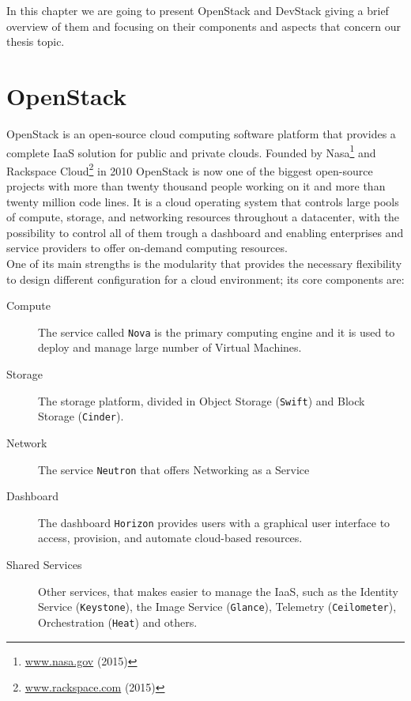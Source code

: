 

In this chapter we are going to present OpenStack and DevStack giving a brief overview of them and focusing on their components and aspects that concern our thesis topic.

\section{OpenStack}
\label{sec:openstack}
OpenStack is an open-source cloud computing software platform that provides a complete IaaS solution for public and private clouds. Founded by Nasa\footnote{\url{www.nasa.gov} (2015)} and Rackspace Cloud\footnote{\url{www.rackspace.com} (2015)} in 2010 OpenStack is now one of the biggest open-source projects with more than twenty thousand people working on it and more than twenty million code lines. It is a cloud operating system that controls large pools of compute, storage, and networking resources throughout a datacenter, with the possibility to control all of them trough a dashboard and enabling enterprises and service providers to offer on-demand computing resources.\\
One of its main strengths is the modularity that provides the necessary flexibility to design different configuration for a cloud environment; its core components are:
\begin{description}
	\item[Compute] The service called \texttt{Nova} is the primary computing engine and it is used to deploy and manage large number of Virtual Machines.
	\item[Storage] The storage platform, divided in Object Storage (\texttt{Swift}) and Block Storage (\texttt{Cinder}).
	\item[Network] The service \texttt{Neutron} that offers Networking as a Service
	\item[Dashboard] The dashboard \texttt{Horizon} provides users with a graphical user interface to access, provision, and automate cloud-based resources.
	\item[Shared Services] Other services, that makes easier to manage the IaaS, such as the Identity Service (\texttt{Keystone}), the Image Service (\texttt{Glance}), Telemetry (\texttt{Ceilometer}), Orchestration (\texttt{Heat}) and others.
\end{description}

